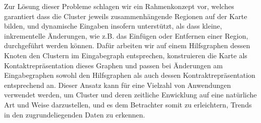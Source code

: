 \begin{addmargin}{0.5cm}
Zur Lösung dieser Probleme schlagen wir ein Rahmenkonzept vor, welches garantiert dass die Cluster jeweils zusammenhängende Regionen auf der Karte bilden, und dynamische Eingaben insofern unterstützt, als dass kleine, inkrementelle Änderungen, wie z.B. das Einfügen oder Entfernen einer Region, durchgeführt werden können.
Dafür arbeiten wir auf einem Hilfsgraphen dessen Knoten den Clustern im Eingabegraph entsprechen, konstruieren die Karte als Kontaktrepräsentation dieses Graphen und passen bei Änderungen am Eingabegraphen sowohl den Hilfsgraphen als auch dessen Kontraktrepräsentation entsprechend an.
Dieser Ansatz kann für eine Vielzahl von Anwendungen verwendet werden, um Cluster und deren zeitliche Enwicklung auf eine natürliche Art und Weise darzustellen, und es dem Betrachter somit zu erleichtern, Trends in den zugrundeliegenden Daten zu erkennen.

\end{addmargin}
